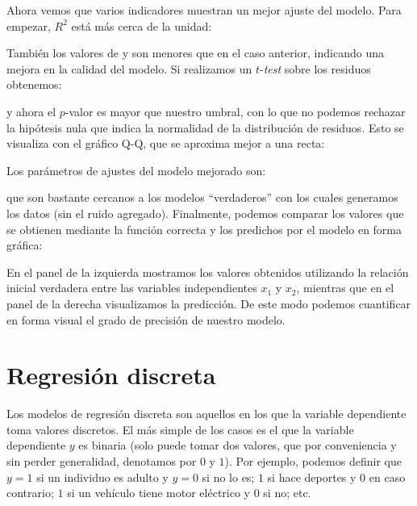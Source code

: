 Ahora vemos que varios indicadores muestran un mejor ajuste del modelo. Para empezar, $R^2$ está más cerca de la unidad:


También los valores de  y  son menores que en el caso anterior, indicando una mejora en la calidad del modelo. Si realizamos un $t$-\textit{test} sobre los residuos obtenemos:


\noindent y ahora el $p$-valor es mayor que nuestro umbral, con lo que no podemos rechazar la hipótesis nula que indica la normalidad de la distribución de residuos. Esto se visualiza con el gráfico Q-Q, que se aproxima mejor a una recta:


Los parámetros de ajustes del modelo mejorado son:


\noindent que son bastante cercanos a los modelos ``verdaderos'' con los cuales generamos los datos (sin el ruido agregado). Finalmente, podemos comparar los valores que se obtienen mediante la función correcta y los predichos por el modelo en forma gráfica:


En el panel de la izquierda mostramos los valores obtenidos utilizando la relación inicial verdadera entre las variables independientes $x_1$ y $x_2$, mientras que en el panel de la derecha visualizamos la predicción. De este modo podemos cuantificar en forma visual el grado de precisión de nuestro modelo.


\section{Regresión discreta}

Los modelos de regresión discreta son aquellos en los que la variable dependiente toma valores discretos. El más simple de los casos es el que la variable dependiente $y$ es binaria (solo puede tomar dos valores, que por conveniencia y sin perder generalidad, denotamos por $0$ y $1$). Por ejemplo, podemos definir que $y = 1$ si un individuo es adulto y $y = 0$ si no lo es; $1$ si hace deportes y $0$ en caso contrario; $1$ si un vehículo tiene motor eléctrico y $0$ si no; etc.

